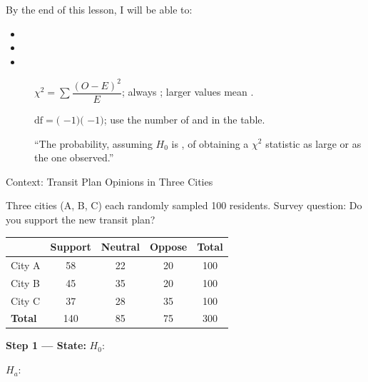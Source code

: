 \documentclass[10pt]{article}
\begin{document}
\namedateperiod

\vspace{0.1in}

\begin{objectivebox}
By the end of this lesson, I will be able to:
\begin{itemize}
  \item \writeline
  \item \writeline
  \item \writeline
\end{itemize}
\end{objectivebox}

\begin{vocabbox}
\begin{description}
  \item[]
        $\chi^2 = \displaystyle\sum \dfrac{(O - E)^2}{E}$; always \blank{2cm};
        larger values mean \blank{5cm}.
  \item[]
        $\text{df} = ($ \blank{2cm} $- 1)($ \blank{2cm} $- 1)$; use the number of
        \blank{3cm} and \blank{3cm} in the table.
  \item[]
        ``The probability, assuming $H_0$ is \blank{2cm}, of obtaining a $\chi^2$
        statistic as large or \blank{3cm} as the one observed.''
\end{description}
\end{vocabbox}

\begin{notesbox}{Context: Transit Plan Opinions in Three Cities}

Three cities (A, B, C) each randomly sampled 100 residents.
Survey question: Do you support the new transit plan?

\renewcommand{\arraystretch}{1.4}
\begin{center}
\begin{tabular}{@{} l c c c c @{}}
\hline
           & \textbf{Support} & \textbf{Neutral} & \textbf{Oppose} & \textbf{Total} \\
\hline
City A     & 58  & 22  & 20  & 100 \\
City B     & 45  & 35  & 20  & 100 \\
City C     & 37  & 28  & 35  & 100 \\
\hline
\textbf{Total} & 140 & 85 & 75 & 300 \\
\hline
\end{tabular}
\end{center}

\textbf{Step 1 --- State:} $H_0$: \writeline

$H_a$: \writeline

\end{notesbox}
\end{document}
